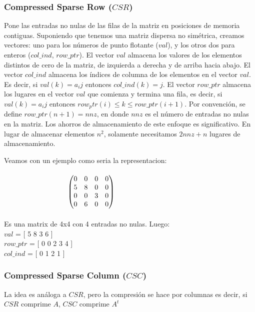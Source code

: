 \subsubsection{Compressed Sparse Row ($CSR$)}

Pone las entradas no nulas de las filas de la matriz en posiciones de memoria contiguas. Suponiendo que tenemos una matriz dispersa no simétrica, creamos vectores: uno para los números de punto flotante ($val$), y los otros dos para enteros ($col\_ind$, $row\_ptr$). El vector $val$ almacena los valores de los elementos distintos de cero de la matriz, de izquierda a derecha y de arriba hacia abajo. El vector $col\_ind$ almacena los índices de columna de los elementos en el vector $val$. Es decir, si $val(k) = a_ij$ entonces $col\_ind(k) = j$. El vector $row\_ptr$ almacena los lugares en el vector $val$ que comienza y termina una fila, es decir, si $val(k) = a_ij$ entonces $row_ptr(i) \leq k \leq row\_ptr(i+1)$. Por convención, se define $row\_ptr(n+1) = nnz$, en donde $nnz$ es el número de entradas no nulas en la matriz. Los ahorros de almacenamiento de este enfoque es significativo. En lugar de almacenar elementos $n^2$, solamente necesitamos $2nnz + n$ lugares de almacenamiento.

Veamos con un ejemplo como seria la representacion:
\\\\
$\hspace{3.2cm}\begin{pmatrix} 0 & 0 & 0 & 0 \\ 5 & 8 & 0 & 0 \\ 0 & 0 & 3 & 0 \\ 0 & 6 & 0 & 0 \\ \end{pmatrix}$
\\\\
Es una matrix de 4x4 con 4 entradas no nulas. Luego:\\
   
   $val$  = [ 5 8 3 6 ] \\
   $row\_ptr$ = [ 0 0 2 3 4 ] \\
   $col\_ind$ = [ 0 1 2 1 ] \\

\subsubsection{Compressed Sparse Column ($CSC$)}

La idea es análoga a $CSR$, pero la compresión se hace por columnas es decir, si $CSR$ comprime $A$, $CSC$ comprime $A^t$  

